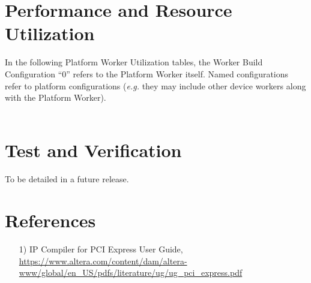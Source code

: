 \documentclass{article}
\edef\ecomp{alst4}
\begin{document}
\begin{landscape}
\section*{Performance and Resource Utilization}
%
In the following Platform Worker Utilization tables, the Worker Build Configuration ``0'' refers to the Platform Worker itself. Named configurations refer to platform configurations (\textit{e.g.} they may include other device workers along with the Platform Worker).\\\\



\section*{Test and Verification}
\begin{flushleft}
 To be detailed in a future release.
\end{flushleft}
\section*{References}
\begin{flushleft}
	\begin{itemize}
		\item[1)] IP Compiler for PCI Express User Guide, \url{https://www.altera.com/content/dam/altera-www/global/en_US/pdfs/literature/ug/ug_pci_express.pdf} \\

	\end{itemize}
\end{flushleft}
\end{landscape}
\end{document}
